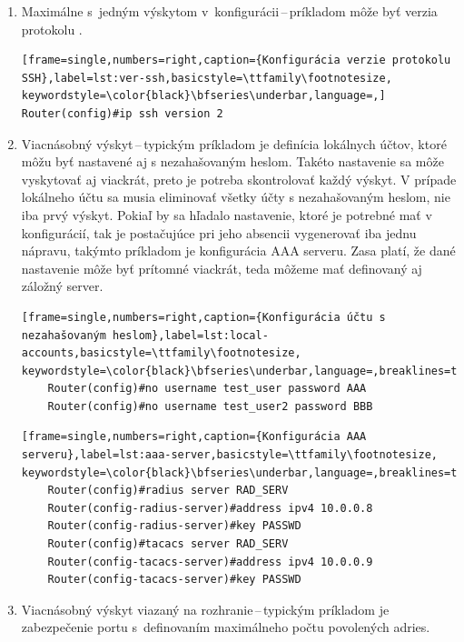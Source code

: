 \begin{enumerate}
	\item Maximálne s~jedným výskytom v~konfigurácii\,--\,príkladom môže byť verzia protokolu .
	
\begin{minipage}{\linewidth}
	
\begin{lstlisting}[frame=single,numbers=right,caption={Konfigurácia verzie protokolu SSH},label=lst:ver-ssh,basicstyle=\ttfamily\footnotesize, keywordstyle=\color{black}\bfseries\underbar,language=,]
Router(config)#ip ssh version 2
\end{lstlisting}
\end{minipage}
	
	\item \vspace{2em} Viacnásobný výskyt\,--\,typickým príkladom je  definícia lokálnych účtov, ktoré môžu byť nastavené aj s nezahašovaným heslom. Takéto nastavenie sa môže vyskytovať aj viackrát, preto je potreba skontrolovať každý výskyt. V prípade lokálneho účtu sa musia eliminovať všetky účty s nezahašovaným heslom, nie iba prvý výskyt. Pokiaľ by sa hľadalo nastavenie, ktoré je potrebné mať v konfigurácií, tak je postačujúce pri jeho absencii vygenerovať iba jednu nápravu, takýmto príkladom je konfigurácia AAA serveru. Zasa platí, že dané nastavenie môže byť prítomné viackrát, teda môžeme mať definovaný aj záložný server.

\begin{minipage}{\linewidth}		
	\begin{lstlisting}[frame=single,numbers=right,caption={Konfigurácia účtu s nezahašovaným heslom},label=lst:local-accounts,basicstyle=\ttfamily\footnotesize, keywordstyle=\color{black}\bfseries\underbar,language=,breaklines=true]
	Router(config)#no username test_user password AAA
	Router(config)#no username test_user2 password BBB
	\end{lstlisting}
\end{minipage}

\begin{minipage}{\linewidth}		
	\begin{lstlisting}[frame=single,numbers=right,caption={Konfigurácia AAA serveru},label=lst:aaa-server,basicstyle=\ttfamily\footnotesize, keywordstyle=\color{black}\bfseries\underbar,language=,breaklines=true]
	Router(config)#radius server RAD_SERV
	Router(config-radius-server)#address ipv4 10.0.0.8
	Router(config-radius-server)#key PASSWD
	Router(config)#tacacs server RAD_SERV
	Router(config-tacacs-server)#address ipv4 10.0.0.9
	Router(config-tacacs-server)#key PASSWD
	\end{lstlisting}
\end{minipage}		
\newpage	
	\item \vspace{2em} Viacnásobný výskyt viazaný na rozhranie\,--\,typickým príkladom je zabezpečenie portu s~definovaním maximálneho počtu povolených  adries.
	

\end{enumerate}

